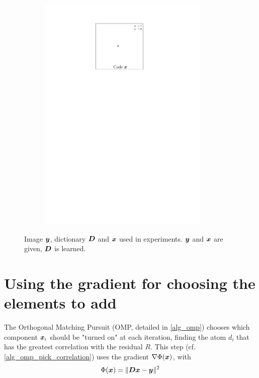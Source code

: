 \begin{figure}[!ht]
\begin{subfigure}[b]{0.32\textwidth}
	\includegraphics[width=0.9\textwidth]{figures/xp_explain/code.pdf}
	\caption{}
\end{subfigure}
\caption{Image $\bm{y}$, dictionary $\bm{D}$ and $\bm{x}$ used in experiments. $\bm{y}$ and $\bm{x}$ are given, $\bm{D}$ is learned.} \label{fig_xp_explain}
\end{figure}

\section{Using the gradient for choosing the elements to add}

The Orthogonal Matching Pursuit (OMP, detailed in \cref{alg_omp}) chooses which component $\bm{x}_i$ should be "turned on" at each iteration, finding the atom $d_i$ that has the greatest correlation with the residual $R$. This step (cf. \cref{alg_omp_pick_correlation}) uses the gradient $\nabla \Phi(\bm{x})$, with $$\Phi(\bm{x}) = \lVert \bm{D}\bm{x} - \bm{y} \rVert^2$$



